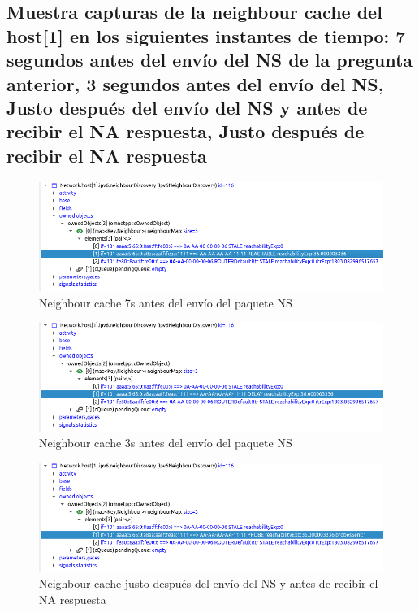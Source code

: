 \subsection{Muestra capturas de la neighbour cache del host[1] en los siguientes instantes de tiempo: 7 segundos antes del envío del NS de la pregunta anterior, 3 segundos antes del envío del NS, Justo después del envío del NS y antes de recibir el NA respuesta, Justo después de recibir el NA respuesta}

\begin{figure}[h]
    \centering
    \includegraphics[width=\textwidth]{img/ej15.1.png}
    \caption{Neighbour cache 7s antes del envío del paquete NS}
    \label{fig:ej15.1}
\end{figure}

\begin{figure}[h]
    \centering
    \includegraphics[width=\textwidth]{img/ej15.2.png}
    \caption{Neighbour cache 3s antes del envío del paquete NS}
    \label{fig:ej15.2}
\end{figure}

\begin{figure}[h]
    \centering
    \includegraphics[width=\textwidth]{img/ej15.3.png}
    \caption{Neighbour cache justo después del envío del NS y antes de recibir el NA respuesta }
    \label{fig:ej15.3}
\end{figure}


